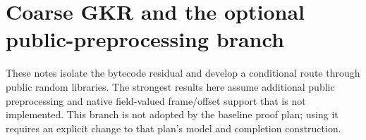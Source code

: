 \section{Coarse GKR and the optional public-preprocessing branch}\label{sec:coarse-preprocessing}

These notes isolate the bytecode residual and develop a conditional route through public random libraries. The strongest results here assume additional public preprocessing and native field-valued frame/offset support that is not implemented. This branch is not adopted by the baseline proof plan; using it requires an explicit change to that plan's model and completion construction.

















